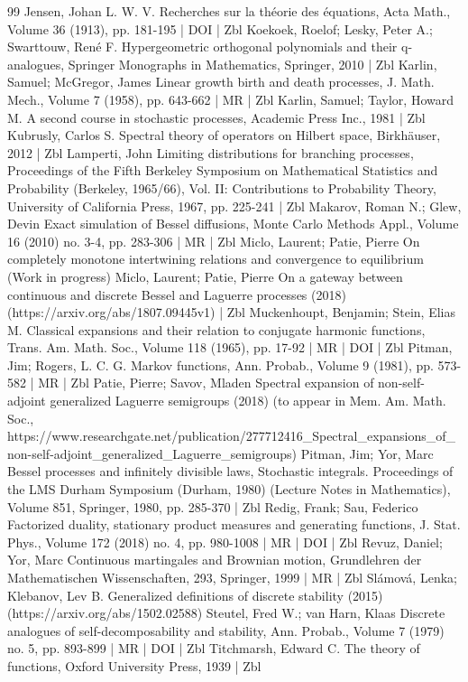 \begin{thebibliography}{99}
Jensen, Johan L. W. V. Recherches sur la théorie des équations, Acta Math., Volume 36 (1913), pp. 181-195 | DOI | Zbl
Koekoek, Roelof; Lesky, Peter A.; Swarttouw, René F. Hypergeometric orthogonal polynomials and their q-analogues, Springer Monographs in Mathematics, Springer, 2010 | Zbl
Karlin, Samuel; McGregor, James Linear growth birth and death processes, J. Math. Mech., Volume 7 (1958), pp. 643-662 | MR | Zbl
Karlin, Samuel; Taylor, Howard M. A second course in stochastic processes, Academic Press Inc., 1981 | Zbl
Kubrusly, Carlos S. Spectral theory of operators on Hilbert space, Birkhäuser, 2012 | Zbl
Lamperti, John Limiting distributions for branching processes, Proceedings of the Fifth Berkeley Symposium on Mathematical Statistics and Probability (Berkeley, 1965/66), Vol. II: Contributions to Probability Theory, University of California Press, 1967, pp. 225-241 | Zbl
Makarov, Roman N.; Glew, Devin Exact simulation of Bessel diffusions, Monte Carlo Methods Appl., Volume 16 (2010) no. 3-4, pp. 283-306 | MR | Zbl
Miclo, Laurent; Patie, Pierre On completely monotone intertwining relations and convergence to equilibrium (Work in progress)
Miclo, Laurent; Patie, Pierre On a gateway between continuous and discrete Bessel and Laguerre processes (2018) (https://arxiv.org/abs/1807.09445v1) | Zbl
Muckenhoupt, Benjamin; Stein, Elias M. Classical expansions and their relation to conjugate harmonic functions, Trans. Am. Math. Soc., Volume 118 (1965), pp. 17-92 | MR | DOI | Zbl
Pitman, Jim; Rogers, L. C. G. Markov functions, Ann. Probab., Volume 9 (1981), pp. 573-582 | MR | Zbl
Patie, Pierre; Savov, Mladen Spectral expansion of non-self-adjoint generalized Laguerre semigroups (2018) (to appear in Mem. Am. Math. Soc., https://www.researchgate.net/publication/277712416\_Spectral\_expansions\_of\_non-self-adjoint\_generalized\_Laguerre\_semigroups)
Pitman, Jim; Yor, Marc Bessel processes and infinitely divisible laws, Stochastic integrals. Proceedings of the LMS Durham Symposium (Durham, 1980) (Lecture Notes in Mathematics), Volume 851, Springer, 1980, pp. 285-370 | Zbl
Redig, Frank; Sau, Federico Factorized duality, stationary product measures and generating functions, J. Stat. Phys., Volume 172 (2018) no. 4, pp. 980-1008 | MR | DOI | Zbl
Revuz, Daniel; Yor, Marc Continuous martingales and Brownian motion, Grundlehren der Mathematischen Wissenschaften, 293, Springer, 1999 | MR | Zbl
Slámová, Lenka; Klebanov, Lev B. Generalized definitions of discrete stability (2015) (https://arxiv.org/abs/1502.02588)
Steutel, Fred W.; van Harn, Klaas Discrete analogues of self-decomposability and stability, Ann. Probab., Volume 7 (1979) no. 5, pp. 893-899 | MR | DOI | Zbl
Titchmarsh, Edward C. The theory of functions, Oxford University Press, 1939 | Zbl
\end{thebibliography}

